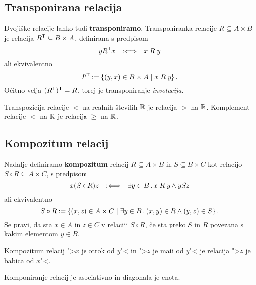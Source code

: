 \subsection{Transponirana relacija}

Dvojiške relacije lahko tudi \textbf{transponiramo}. Transponiranka relacije $R \subseteq A \times B$ je relacija $R^{\mathsf{T}} \subseteq B \times A$, definirana s predpisom
%
\begin{equation*}
    y R^{\mathsf{T}} x \quad {{:}{\Longleftrightarrow}}\quad x \mathrel{R} y
\end{equation*}
%
ali ekvivalentno
%
\begin{equation*}
  R^{\mathsf{T}} \mathbin{{:}{=}} \left\{ (y, x) \in B \times A \; \middle| \; x \mathrel{R} y \right\}.
\end{equation*}
%
Očitno velja $(R^{\mathsf{T}})^{\mathsf{T}} = R$, torej je transponiranje \emph{involucija}.

\begin{primer}
  Transpozicija relacije $<$ na realnih številih $\mathbb{R}$ je relacija $>$ na $\mathbb{R}$.
  Komplement relacije $<$ na $\mathbb{R}$ je relacija $\geq$ na $\mathbb{R}$.
\end{primer}

\subsection{Kompozitum relacij}

Nadalje definiramo \textbf{kompozitum} relacij $R \subseteq A \times B$ in $S \subseteq B \times C$ kot relacijo $S \circ R \subseteq A \times C$, s predpisom
%
\begin{equation*}
    x (S \circ R) z \quad {{:}{\Longleftrightarrow}}\quad \exists y \in B \,.\, x \mathrel{R} y \land y S z
\end{equation*}
ali ekvivalentno
%
\begin{equation*}
  S \circ R \mathbin{{:}{=}}
  \left\{ (x, z) \in A \times C \; \middle| \; \exists y \in B \,.\, (x,y) \in R \land (y,z) \in S \right\}.
\end{equation*}
%
Se pravi, da sta $x \in A$ in $z \in C$ v relaciji $S \circ R$, če sta preko $S$ in $R$
povezana s kakim elementom $y \in B$.

\begin{primer}
  Kompozitum relacij ">$x$ je otrok od $y$"< in ">$z$ je mati od $y$"< je relacija
  ">$z$ je babica od $x$"<.
\end{primer}

\begin{izrek}
  Komponiranje relacij je asociativno in diagonala je enota.
\end{izrek}

